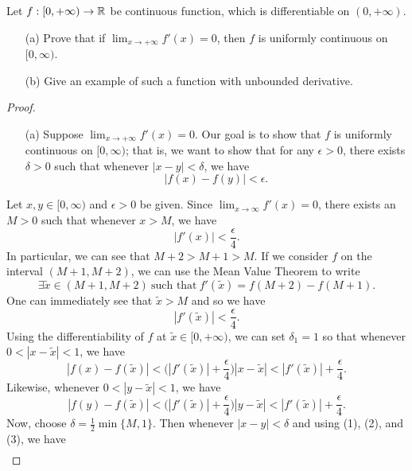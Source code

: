 \documentclass[a4paper]{article}
\begin{document}
\begin{problem}
    Let  \( f : [0,+\infty) \to \mathbb{R}  \) be continuous function, which is differentiable on \( (0,+ \infty ) \).
    \begin{enumerate}
        \item[(a)] Prove that if \( \lim_{ x \to  + \infty  } f'(x) = 0  \), then \( f  \) is uniformly continuous on \( [0,\infty ) \).
        \item[(b)] Give an example of such a function with unbounded derivative.
    \end{enumerate}
\end{problem}
\begin{proof}
    \begin{enumerate}        
        \item[(a)] Suppose \( \lim_{ x \to + \infty  } f'(x) = 0  \). Our goal is to show that \( f  \) is uniformly continuous on \( [0,\infty) \); that is, we want to show that for any \( \epsilon > 0  \), there exists \( \delta > 0  \) such that whenever \( | x - y  |  < \delta \), we have     
            \[  | f(x) - f(y) |  < \epsilon. \]
    \end{enumerate}
    Let \( x,y \in [0,\infty) \) and \( \epsilon > 0  \) be given. Since \( \lim_{ x \to \infty  }  f'(x) = 0  \), there exists an \( M > 0  \) such that whenever \( x > M  \), we have 
    \[  | f'(x) | < \frac{ \epsilon }{ 4 }. \]
    In particular, we can see that \( M + 2 > M  + 1 > M  \). If we consider \( f \) on the interval \( (M+1, M+2)  \), we can use the Mean Value Theorem to write
    \[  \exists \tilde{x} \in (M+1, M+2) \ \text{such that} \ f'(\tilde{x}) = f(M+2) - f(M+1). \]
    One can immediately see that \( \tilde{x} > M  \) and so we have 
    \[  | f'(\tilde{x}) | < \frac{ \epsilon }{ 4 }. \tag{1} \]
    Using the differentiability of \( f  \) at \( \tilde{x} \in [0,+\infty) \), we can set \( {\delta}_{1} = 1  \) so that whenever \(  0 < | x - \tilde{x} | < 1  \), we have 
    \[  | f(x) - f(\tilde{x}) | < \Big(| f'(\tilde{x}) | + \frac{ \epsilon }{ 4 }  \Big) | x - \tilde{x}  |  < | f'(\tilde{x}) |+ \frac{ \epsilon }{ 4 }. \tag{2} \]
    Likewise, whenever \( 0 < | y - \tilde{x} | < 1  \), we have 
    \[  | f(y) - f(\tilde{x}) | < \Big(  | f'(\tilde{x}) | + \frac{ \epsilon }{ 4 }  \Big) | y - \tilde{x} | < | f'(\tilde{x}) |  + \frac{ \epsilon }{ 4 }. \tag{3} \]
    Now, choose \( \delta = \frac{ 1 }{ 2 } \min \{ M , 1  \}  \). Then whenever \( | x -  y |  < \delta \) and using (1), (2), and (3), we have 
    \begin{align*}

\end{align*}
\end{proof}
\end{document}
